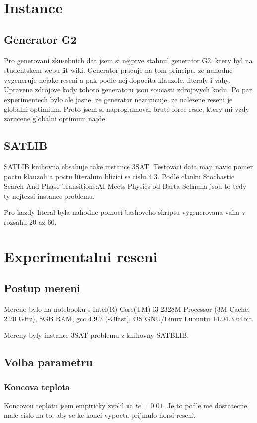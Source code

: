 \documentclass[12pt,a4paper]{article}
\begin{document}
\section{Instance}

\subsection{Generator G2}

Pro generovani zkusebnich dat jsem si nejprve stahnul generator G2, ktery byl na studentskem webu fit-wiki. Generator pracuje na tom principu, ze nahodne vygeneruje nejake reseni a pak podle nej dopocita klauzole, literaly i vahy. Upravene zdrojove kody tohoto generatoru jsou soucasti zdrojovych kodu. Po par experimentech bylo ale jasne, ze generator nezarucuje, ze nalezene reseni je globalni optimium. Proto jsem si naprogramoval brute force resic, ktery mi vzdy zarucene globalni optimum najde. 

\subsection{SATLIB}

SATLIB knihovna obsahuje take instance 3SAT. Testovaci data maji navic pomer poctu klauzoli a poctu literalum blizici se cislu 4.3. Podle clanku Stochastic Search And Phase Transitions:AI Meets Physics od Barta Selmana jsou to tedy ty nejtezsi instance problemu.

Pro kazdy literal byla nahodne pomoci bashoveho skriptu vygenerovana vaha v rozsahu 20 az 60.

\section{Experimentalni reseni}

\subsection{Postup mereni}
Mereno bylo na notebooku s Intel(R) Core(TM) i3-2328M Processor (3M Cache, 2.20 GHz), 8GB RAM, gcc 4.9.2 (-Ofast), OS GNU/Linux Lubuntu 14.04.3 64bit.

Mereny byly instance 3SAT problemu z knihovny SATBLIB.

\subsection{Volba parametru}

\subsubsection{Koncova teplota}
Koncovou teplotu jsem empiricky zvolil na $te = 0.01$. Je to podle me dostatecne male cislo na to, aby se ke konci vypoctu prijmulo horsi reseni.
\end{document}
